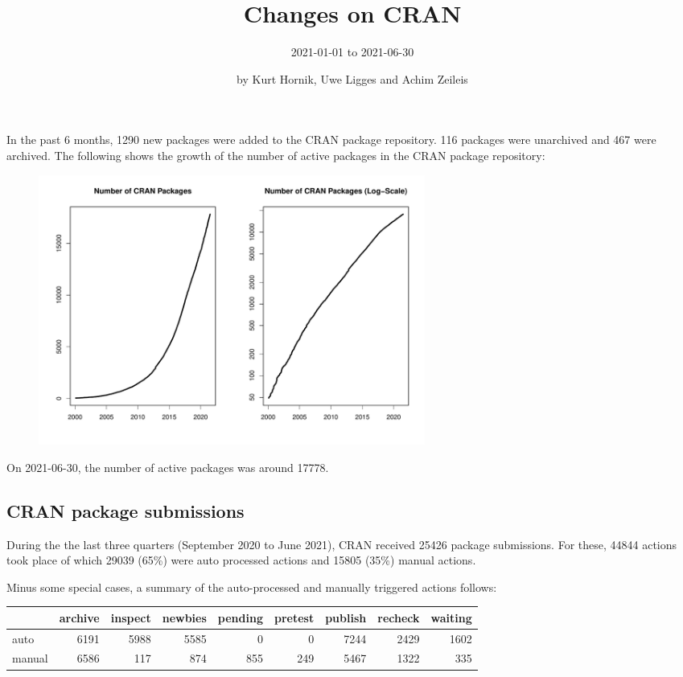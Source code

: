 \title{Changes on CRAN}
\subtitle{2021-01-01 to 2021-06-30}
\author{by Kurt Hornik, Uwe Ligges and Achim Zeileis}
\maketitle

\sloppy


In the past 6 months, 1290 new packages were added to the CRAN package
repository.  116 packages were unarchived and 467 were archived.  The
following shows the growth of the number of active packages in the CRAN
package repository:

\begin{figure}[h]
  \centering
  \includegraphics[width=5in]{cran_growth}
\end{figure}

\noindent
On 2021-06-30, the number of active packages was around 17778.




\subsection{CRAN package submissions}

During the the last three quarters (September 2020 to June 2021), CRAN received 25426
package submissions.
For these, 44844 actions took place of which 29039 (65\%) were auto
processed actions and
15805 (35\%) manual actions.

Minus some special cases, a summary of the auto-processed and manually
triggered actions follows:
\begin{center}
\begin{tabular}{l|rrrrrrrr}
       &  archive& inspect& newbies& pending& pretest& publish& recheck& waiting\\ \hline
auto  &   6191  &  5988 &  5585  &     0  &     0  &  7244  &  2429  & 1602  \\
manual&   6586  &    117&   874  &   855  &   249  &  5467  &  1322  & 335  \\
\end{tabular}
\end{center}

